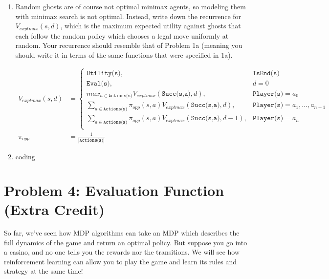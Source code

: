 \documentclass[10pt]{article}
\begin{document}
\begin{enumerate}[label=(\alph*)]

  \item Random ghosts are of course not optimal minimax agents, so modeling them with minimax search is not optimal. Instead, write down the recurrence for $V_{exptmax}(s,d)$, which is the maximum expected utility against ghosts that each follow the random policy which chooses a legal move uniformly at random. Your recurrence should resemble that of Problem 1a (meaning you should write it in terms of the same functions that were specified in 1a).
  
  \begin{align*}
  V_{exptmax}(s,d) &= \begin{cases}
  \texttt{Utility(s)}, &\texttt{IsEnd(s)}\\
  \texttt{Eval(s)}, &d = 0\\
  max_{a \in \texttt{Actions(s)}}V_{exptmax}(\texttt{Succ(s,a)},d), &\texttt{Player(s)} = a_0\\
  \sum_{a \in \texttt{Actions(s)}}\pi_{opp}(s,a)V_{exptmax}(\texttt{Succ(s,a)},d), &\texttt{Player(s)} = a_1, \dots, a_{n-1}\\
  \sum_{a \in \texttt{Actions(s)}}\pi_{opp}(s,a)V_{exptmax}(\texttt{Succ(s,a)},d-1), &\texttt{Player(s)} = a_n\\
  \end{cases}\\ 
  \pi_{opp} &= \frac{1}{|\texttt{Actions(s)}|}
  \end{align*}
  
  \item coding
		
\end{enumerate}

\section*{\normalsize Problem 4: Evaluation Function (Extra Credit)}

So far, we've seen how MDP algorithms can take an MDP which describes the full dynamics of the game and return an optimal policy. But suppose you go into a casino, and no one tells you the rewards nor the transitions. We will see how reinforcement learning can allow you to play the game and learn its rules and strategy at the same time!
\end{document}
